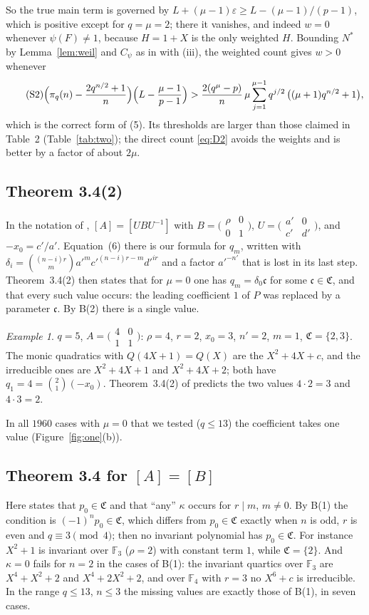 \documentclass[11pt,a4paper]{amsart}
\theoremstyle{remark}
\newtheorem{example}[theorem]{Example}
\newcommand{\F}{\mathbb{F}}
\newcommand{\fC}{\mathfrak{C}}
\newcommand{\mat}[4]{\bigl(\begin{smallmatrix}#1&#2\\#3&#4\end{smallmatrix}\bigr)}
\begin{document}
So the true main term is governed by $L+(\mu-1)\varepsilon\ge L-(\mu-1)/(p-1)$, which is positive except for
$q=\mu=2$; there it vanishes, and indeed $w=0$ whenever $\psi(F)\ne1$, because $H=1+X$ is the only weighted $H$.
Bounding $N^*$ by Lemma~\ref{lem:weil} and $C_\psi$ as in \cite{K} with (iii), the weighted count gives $w>0$
whenever
\begin{equation}\label{eq:S2}\tag{S2}
\Bigl(\pi_q(n)-\frac{2q^{n/2}+1}{n}\Bigr)\Bigl(L-\frac{\mu-1}{p-1}\Bigr)
>\frac{2(q^\mu-p)}{n}\,\mu\sum_{j=1}^{\mu-1}q^{j/2}\,\bigl((\mu+1)q^{n/2}+1\bigr),
\end{equation}
which is the correct form of (5). Its thresholds are larger than those claimed in Table~2 (Table~\ref{tab:two});
the direct count \eqref{eq:D2} avoids the weights and is better by a factor of about $2\mu$.

\subsection{Theorem 3.4(2)}
In the notation of \cite{K}, $[A]=[UBU^{-1}]$ with $B=\mat\rho001$, $U=\mat{a'}0{c'}{d'}$, and $-x_0=c'/a'$.
Equation~(6) there is our formula for $q_m$, written with $\delta_i=\binom{(n-i)r}{m}a'^mc'^{(n-i)r-m}d'^{ir}$
and a factor $a'^{-n'}$ that is lost in its last step. Theorem~3.4(2) then states that for $\mu=0$ one has
$q_m=\delta_0\mathfrak{c}$ for some $\mathfrak{c}\in\fC$, and that every such value occurs: the leading
coefficient $1$ of $P$ was replaced by a parameter $\mathfrak{c}$. By B(2) there is a single value.

\begin{example}\label{ex:q5}
$q=5$, $A=\mat4011$: $\rho=4$, $r=2$, $x_0=3$, $n'=2$, $m=1$, $\fC=\{2,3\}$. The monic quadratics with
$Q(4X+1)=Q(X)$ are the $X^2+4X+c$, and the irreducible ones are $X^2+4X+1$ and $X^2+4X+2$; both have
$q_1=4=\binom21(-x_0)$. Theorem~3.4(2) of \cite{K} predicts the two values $4\cdot2=3$ and $4\cdot3=2$.
\end{example}

In all $1960$ cases with $\mu=0$ that we tested ($q\le13$) the coefficient takes one value
(Figure~\ref{fig:one}(b)).

\subsection{Theorem 3.4 for \texorpdfstring{$[A]=[B]$}{[A]=[B]}}
Here \cite{K} states that $p_0\in\fC$ and that ``any'' $\kappa$ occurs for $r\mid m$, $m\ne0$. By B(1) the
condition is $(-1)^np_0\in\fC$, which differs from $p_0\in\fC$ exactly when $n$ is odd, $r$ is even and
$q\equiv3\pmod4$; then no invariant polynomial has $p_0\in\fC$. For instance $X^2+1$ is invariant over $\F_3$
($\rho=2$) with constant term $1$, while $\fC=\{2\}$. And $\kappa=0$ fails for $n=2$ in the cases of B(1): the
invariant quartics over $\F_3$ are $X^4+X^2+2$ and $X^4+2X^2+2$, and over $\F_4$ with $r=3$ no $X^6+c$ is
irreducible. In the range $q\le13$, $n\le3$ the missing values are exactly those of B(1), in seven cases.
\end{document}
